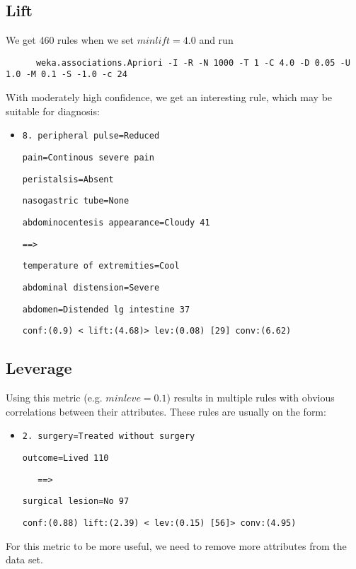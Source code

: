 \subsection{Lift}
We get 460 rules when we set $minlift = 4.0$ and run
\begin{verbatim}
	  weka.associations.Apriori -I -R -N 1000 -T 1 -C 4.0 -D 0.05 -U 1.0 -M 0.1 -S -1.0 -c 24
\end{verbatim}
With moderately high confidence, we get an interesting rule, which may be suitable for diagnosis:
\begin{itemize}
\item   \verb|8. peripheral pulse=Reduced|

\verb|pain=Continous severe pain| 

\verb|peristalsis=Absent| 

\verb|nasogastric tube=None| 

\verb|abdominocentesis appearance=Cloudy 41 |


\verb|==>| 


\verb|temperature of extremities=Cool| 

\verb|abdominal distension=Severe |

\verb|abdomen=Distended lg intestine 37 | 
  
\verb|conf:(0.9) < lift:(4.68)> lev:(0.08) [29] conv:(6.62)|

\end{itemize}



\subsection{Leverage}
Using this metric (e.g. $minleve = 0.1$) results in multiple rules with obvious correlations between their attributes.
These rules are usually on the form:
\begin{itemize}
\item \verb|2. surgery=Treated without surgery| 

\verb|outcome=Lived 110|


\verb|   ==>|
 
\verb|surgical lesion=No 97|

\verb|conf:(0.88) lift:(2.39) < lev:(0.15) [56]> conv:(4.95)|
\end{itemize}
For this metric to be more useful, we need to remove more attributes from the data set.


